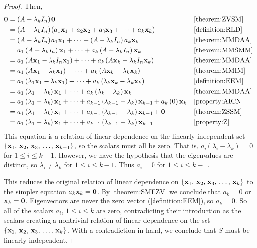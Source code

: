 \documentclass{ximera}
\begin{document}
\begin{theorem}
\begin{proof}
  Then,
  \begin{align*}
    \mathbf{0}
    &=\left(A-\lambda_kI_n\right)\mathbf{0}
    &&\ref{theorem:ZVSM}\\
    &=\left(A-\lambda_kI_n\right)\left(a_{1}\mathbf{x}_{1}+a_{2}\mathbf{x}_{2}+a_{3}\mathbf{x}_{3}+\cdots +a_{k}\mathbf{x}_{k}\right)
    &&\ref{definition:RLD}\\
    &=\left(A-\lambda_kI_n\right)a_1\mathbf{x}_1+
      \cdots+
      \left(A-\lambda_kI_n\right)a_k\mathbf{x}_k
    &&\ref{theorem:MMDAA}\\
    &=a_1\left(A-\lambda_kI_n\right)\mathbf{x}_1+
      \cdots+
      a_k\left(A-\lambda_kI_n\right)\mathbf{x}_k
    &&\ref{theorem:MMSMM}\\
    &=a_1\left(A\mathbf{x}_1-\lambda_kI_n\mathbf{x}_1\right)+
      \cdots+
      a_k\left(A\mathbf{x}_k-\lambda_kI_n\mathbf{x}_k\right)
    &&\ref{theorem:MMDAA}\\
    &=a_1\left(A\mathbf{x}_1-\lambda_k\mathbf{x}_1\right)+
      \cdots+
      a_k\left(A\mathbf{x}_k-\lambda_k\mathbf{x}_k\right)
    &&\ref{theorem:MMIM}\\
    &=a_1\left(\lambda_1\mathbf{x}_1-\lambda_k\mathbf{x}_1\right)+
      \cdots+
      a_k\left(\lambda_k\mathbf{x}_k-\lambda_k\mathbf{x}_k\right)
    &&\ref{definition:EEM}\\
    &=a_1\left(\lambda_1-\lambda_k\right)\mathbf{x}_1+
      \cdots+
      a_k\left(\lambda_k-\lambda_k\right)\mathbf{x}_k
    &&\ref{theorem:MMDAA}\\
    &=a_1\left(\lambda_1-\lambda_k\right)\mathbf{x}_1+
      \cdots+
      a_{k-1}\left(\lambda_{k-1}-\lambda_k\right)\mathbf{x}_{k-1}+
      a_k\left(0\right)\mathbf{x}_k
    &&\ref{property:AICN}\\
    &=a_1\left(\lambda_1-\lambda_k\right)\mathbf{x}_1+
      \cdots+
      a_{k-1}\left(\lambda_{k-1}-\lambda_k\right)\mathbf{x}_{k-1}+
      \mathbf{0}
    &&\ref{theorem:ZSSM}\\
    &=a_1\left(\lambda_1-\lambda_k\right)\mathbf{x}_1+
      \cdots+
      a_{k-1}\left(\lambda_{k-1}-\lambda_k\right)\mathbf{x}_{k-1}
    &&\ref{property:Z}
  \end{align*}
  This equation is a relation of linear dependence on the linearly
  independent set $\left\{\mathbf{x}_{1},\,\mathbf{x}_{2},\,\mathbf{x}_{3},\,\ldots,\,\mathbf{x}_{k-1}\right\}$, so the scalars must all
  be zero.  That is, $a_i\left(\lambda_i-\lambda_k\right)=0$ for
  $1\leq i\leq k-1$.  However, we have the hypothesis that the
  eigenvalues are distinct, so $\lambda_i\neq\lambda_k$ for
  $1\leq i\leq k-1$.  Thus $a_i=0$ for $1\leq i\leq k-1$.

  This reduces the original relation of linear dependence on
  $\left\{\mathbf{x}_{1},\,\mathbf{x}_{2},\,\mathbf{x}_{3},\,\ldots,\,\mathbf{x}_{k}\right\}$ to the simpler equation
  $a_k\mathbf{x}_k=\mathbf{0}$.  By \ref{theorem:SMEZV} we conclude
  that $a_k=0$ or $\mathbf{x}_k=\mathbf{0}$.  Eigenvectors are never
  the zero vector (\ref{definition:EEM}), so $a_k=0$.  So all of the
  scalars $a_i$, $1\leq i\leq k$ are zero, contradicting their
  introduction as the scalars creating a nontrivial relation of linear
  dependence on the set $\left\{\mathbf{x}_{1},\,\mathbf{x}_{2},\,\mathbf{x}_{3},\,\ldots,\,\mathbf{x}_{k}\right\}$.  With a
  contradiction in hand, we conclude that $S$ must be linearly
  independent.
\end{proof}
\end{theorem}
\end{document}

